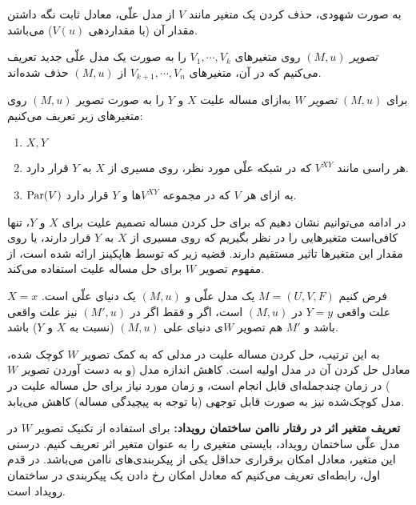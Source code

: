به صورت شهودی، حذف کردن یک متغیر مانند
$V$
از مدل علّی، معادل ثابت نگه داشتن مقدار آن
(با مقداردهی $V(u)$)
می‌باشد.

\begin{definition}\label{def:projection}
  \textit{تصویر} $(M,u)$
  روی متغیرهای
  $V_1,\cdots,V_k$
  را به صورت یک مدل علّی جدید تعریف می‌کنیم
  که در آن، متغیرهای
  $V_{k+1},\cdots,V_n$
  از
  $(M,u)$
  حذف شده‌اند.
\end{definition}

\begin{definition}\label{def:w-projection}
  برای
  $(M,u)$
  \textit{تصویر $W$}
  به‌ازای مساله علیت
  $X$ و $Y$
  را به صورت تصویر
  $(M,u)$
  روی متغیرهای زیر تعریف می‌کنیم:
  \begin{enumerate}[label=(\alph*)]
    \item $X,Y$
    \item هر راسی مانند
    $V^{XY}$
    که در شبکه علّی مورد نظر،
    روی مسیری از
    $X$ به $Y$
    قرار دارد.
    \item $\operatorname{Par}(V)$
    به ازای هر
    $V$
    که در مجموعه
    $V^{XY}$ها
    و $Y$
    قرار دارد.
  \end{enumerate}
\end{definition}

در ادامه می‌توانیم نشان دهیم که
برای حل کردن مساله تصمیم علیت برای
$X$ و $Y$،
تنها کافی‌است متغیرهایی را در نظر بگیریم که
روی مسیری از
$X$ به $Y$
قرار دارند، یا روی مقدار این متغیرها
تاثیر مستقیم دارند.
قضیه زیر که توسط هاپکینز ارائه شده است،
از مفهوم
تصویر $W$
برای حل مساله علیت استفاده می‌کند.

\begin{theorem}\label{thm:causality-w-projection}
  فرض کنیم
  $M=(U,V,F)$
  یک مدل علّی و
  $(M,u)$
  یک دنیای علّی است.
  $X=x$
  علت واقعی
  $Y=y$
  در
  $(M,u)$
  است، اگر و فقط اگر در
  $(M',u)$
  نیز علت واقعی باشد و
  $M'$
  هم
  تصویر $W$ی
  دنیای علی
  $(M,u)$
  (نسبت به
  $X$ و $Y$)
  باشد.
\end{theorem}

به این ترتیب، حل کردن مساله علیت در مدلی که
به کمک
تصویر $W$
کوچک شده، معادل حل کردن آن در مدل اولیه است.
کاهش اندازه مدل
(و به دست آوردن تصویر $W$)
در زمان چندجمله‌ای قابل انجام است،
و زمان مورد نیاز برای حل مساله علیت در مدل کوچک‌شده
نیز به صورت  قابل توجهی
(با توجه به پیچیدگی مساله)
کاهش می‌یابد.

\textbf{تعریف متغیر اثر در رفتار ناامن ساختمان رویداد:}
برای استفاده از تکنیک
تصویر $W$
در مدل علّی ساختمان رویداد،
بایستی متغیری را به عنوان متغیر اثر تعریف کنیم.
درستی این متغیر، معادل
امکان برقراری حداقل یکی از پیکربندی‌های ناامن می‌باشد.
در قدم اول، رابطه‌ای تعریف می‌کنیم که معادل
امکان رخ دادن یک پیکربندی در ساختمان رویداد است.

